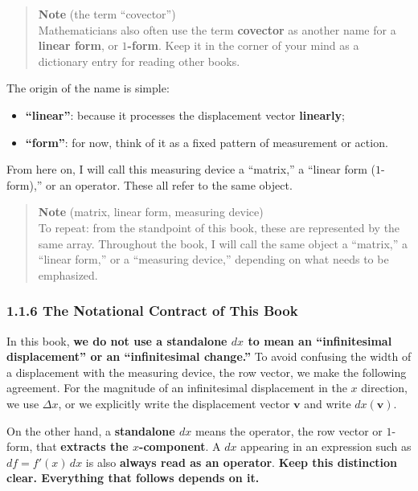 \begin{quote}
\textbf{Note} (the term ``covector'')\\
Mathematicians also often use the term \textbf{covector} as another name
for a \textbf{linear form}, or \textbf{$1$-form}. Keep it in the corner
of your mind as a dictionary entry for reading other books.
\end{quote}

The origin of the name is simple:

\begin{itemize}
\item
  \textbf{“linear”}: because it processes the displacement vector
  \textbf{linearly};
\item
  \textbf{“form”}: for now, think of it as a fixed pattern of
  measurement or action.
\end{itemize}

From here on, I will call this measuring device a ``matrix,'' a ``linear
form (\(1\)-form),'' or an operator. These all refer to the same object.

\begin{quote}
\textbf{Note} (matrix, linear form, measuring device)\\
To repeat: from the standpoint of this book, these are represented by
the same array. Throughout the book, I will call the same object a
``matrix,'' a ``linear form,'' or a ``measuring device,'' depending on
what needs to be emphasized.
\end{quote}

\hypertarget{the-notational-contract-of-this-book}{%
\subsubsection{1.1.6 The Notational Contract of This
Book}\label{the-notational-contract-of-this-book}}

In this book,
\textbf{we do not use a standalone $dx$ to mean an “infinitesimal displacement” or an “infinitesimal change.”}
To avoid confusing the width of a displacement with the measuring
device, the row vector, we make the following agreement. For the
magnitude of an infinitesimal displacement in the \(x\) direction, we
use \(\Delta x\), or we explicitly write the displacement vector
\(\mathbf{v}\) and write \(dx(\mathbf{v})\).

On the other hand, a \textbf{standalone $dx$} means the operator, the
row vector or \(1\)-form, that \textbf{extracts the $x$-component}. A
\(dx\) appearing in an expression such as \(df=f'(x)\,dx\) is also
\textbf{always read as an operator}.
\textbf{Keep this distinction clear. Everything that follows depends on it.}

